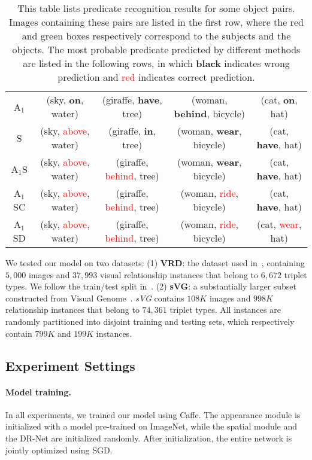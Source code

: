 \documentclass[10pt,twocolumn,letterpaper]{article}
\begin{document}
\begin{table*}
\begin{tabular}{c|c|c|c|c}
        \\
        A$_1$ & (sky, \textbf{on}, water)
        & (giraffe, \textbf{have}, tree) 
        & (woman, \textbf{behind}, bicycle)
        & (cat, \textbf{on}, hat)
        \\
        S & (sky, \textcolor{red}{above}, water)
        & (giraffe, \textbf{in}, tree) 
        & (woman, \textbf{wear}, bicycle)
        & (cat, \textbf{have}, hat)
        \\
        A$_1$S & (sky, \textcolor{red}{above}, water)
        & (giraffe, \textcolor{red}{behind}, tree)
        & (woman, \textbf{wear}, bicycle)
        & (cat, \textbf{have}, hat)
        \\
        A$_1$SC & (sky, \textcolor{red}{above}, water)
        & (giraffe, \textcolor{red}{behind}, tree)
        & (woman, \textcolor{red}{ride}, bicycle)
        & (cat, \textbf{have}, hat)
        \\
        A$_1$SD & (sky, \textcolor{red}{above}, water)
        & (giraffe, \textcolor{red}{behind}, tree)
        & (woman, \textcolor{red}{ride}, bicycle)
        & (cat, \textcolor{red}{wear}, hat)
    \end{tabular}
    \caption{\small This table lists predicate recognition results for some object pairs. 
    Images containing these pairs are listed in the first row,
    where the red and green boxes respectively correspond to the subjects and the objects.
    The most probable predicate predicted by different methods are listed in the following rows,
    in which \textbf{black} indicates wrong prediction and \textcolor{red}{red} indicates correct prediction.}
    \label{tab:itr_sample}
\end{table*}

We tested our model on two datasets:
(1) \textbf{VRD}: the dataset used in~\cite{lu2016visual},
containing $5,000$ images and
$37,993$ visual relationship instances that belong to
$6,672$ triplet types.
We follow the train/test split in~\cite{lu2016visual}.
(2) \textbf{sVG}: a substantially larger subset
constructed from Visual Genome~\cite{krishnavisualgenome}.
\emph{sVG} contains $108K$ images and $998K$ relationship instances
that belong to $74,361$ triplet types.
All instances are randomly partitioned into disjoint training and testing sets,
which respectively contain $799K$ and $199K$ instances.

\subsection{Experiment Settings}\paragraph{Model training.}%
In all experiments, we trained our model using Caffe\cite{jia2014caffe}.
The appearance module is initialized with a model pre-trained on ImageNet,
while the spatial module and the DR-Net are initialized randomly.
After initialization, the entire network is jointly optimized using SGD.
\end{document}
